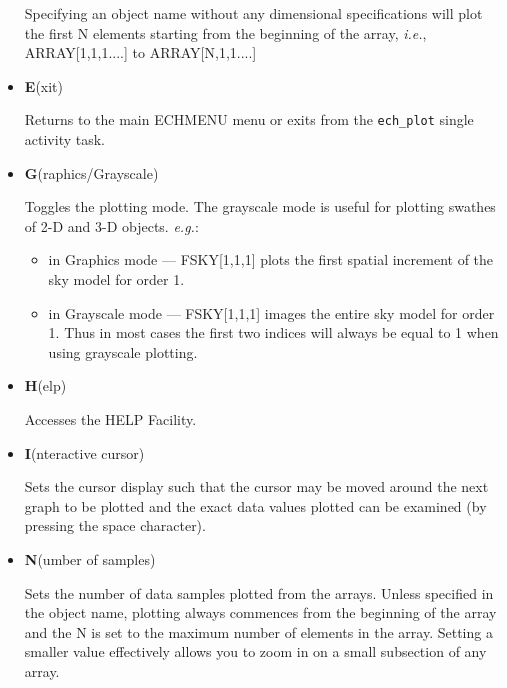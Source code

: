 \documentclass[twoside,11pt,nolof]{starlink}
\newcommand{\sunspec}[2]{#2}
\newcommand{\myindex}[1]{\index{#1}}
\begin{document}
\begin{itemize}
     Specifying an object name without any dimensional specifications will
     plot the first N elements starting from the beginning of the array,
     {\textit{i.e.}}, ARRAY[1,1,1....] to ARRAY[N,1,1....]

\item {\sunspec{\Large\tt}{\bf} E}(xit)

     Returns to the main ECHMENU menu or exits from
     the \verb+ech_plot+ single activity task.

\item {\sunspec{\Large\tt}{\bf} G}(raphics/Grayscale)

     Toggles the plotting mode. The
     grayscale mode is useful for plotting swathes of 2-D and 3-D objects.
     {\textit{e.g.}}:

     \begin{itemize}

     \item in Graphics mode --- FSKY[1,1,1] plots the first spatial
            increment of the sky model for order 1.

     \item in Grayscale mode --- FSKY[1,1,1] images the entire sky model
            for order 1.  Thus in most cases the first two indices will
            always be equal to 1 when using grayscale plotting.

     \end{itemize}

\item {\sunspec{\Large\tt}{\bf} H}(elp)

     Accesses the HELP Facility.

\item {\sunspec{\Large\tt}{\bf} I}(nteractive cursor)

     Sets the cursor display such that
     the cursor may be moved around the next graph to be plotted and the
     exact data values plotted can be examined (by pressing the space
     character).

\item {\sunspec{\Large\tt}{\bf} N}(umber of samples)
     \myindex{Plotter!subsets}

     Sets the number of data samples plotted from the arrays.
     Unless specified in the object name,
     plotting always commences from the beginning of the array and the N
     is set to the maximum number of elements in the array. Setting a
     smaller value effectively allows you to zoom in on a small subsection
     of any array.


\end{itemize}
\end{document}
